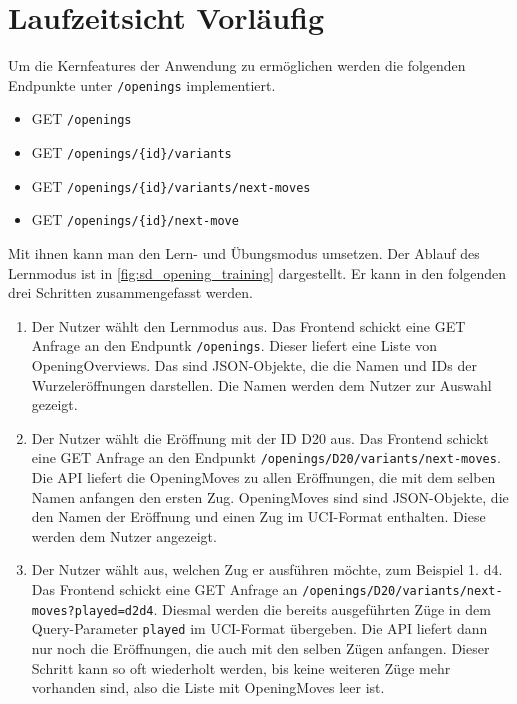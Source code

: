 \section{Laufzeitsicht Vorläufig}
Um die Kernfeatures der Anwendung zu ermöglichen werden die folgenden Endpunkte unter \lstinline{/openings} implementiert.

\begin{itemize}
    \item GET \verb|/openings|
    \item GET \verb|/openings/{id}/variants|
    \item GET \verb|/openings/{id}/variants/next-moves|
    \item GET \verb|/openings/{id}/next-move|
\end{itemize}

Mit ihnen kann man den Lern- und Übungsmodus umsetzen. Der Ablauf des Lernmodus ist in \autoref{fig:sd_opening_training} dargestellt. Er kann in den folgenden drei Schritten zusammengefasst werden.

\begin{enumerate}
     \item Der Nutzer wählt den Lernmodus aus. Das Frontend schickt eine GET Anfrage an den Endpuntk \lstinline{/openings}. Dieser liefert eine Liste von OpeningOverviews. Das sind JSON-Objekte, die die Namen und IDs der Wurzeleröffnungen darstellen. Die Namen werden dem Nutzer zur Auswahl gezeigt.
     \item Der Nutzer wählt die Eröffnung mit der ID D20 aus. Das Frontend schickt eine GET Anfrage an den Endpunkt \lstinline|/openings/D20/variants/next-moves|. Die API liefert die OpeningMoves zu allen Eröffnungen, die mit dem selben Namen anfangen den ersten Zug. OpeningMoves sind sind JSON-Objekte, die den Namen der Eröffnung und einen Zug im UCI-Format enthalten. Diese werden dem Nutzer angezeigt.
     \item Der Nutzer wählt aus, welchen Zug er ausführen möchte, zum Beispiel 1. d4. Das Frontend schickt eine GET Anfrage an \lstinline|/openings/D20/variants/next-moves?played=d2d4|. Diesmal werden die bereits ausgeführten Züge in dem Query-Parameter \lstinline{played} im UCI-Format übergeben. Die API liefert dann nur noch die Eröffnungen, die auch mit den selben Zügen anfangen. Dieser Schritt kann so oft wiederholt werden, bis keine weiteren Züge mehr vorhanden sind, also die Liste mit OpeningMoves leer ist.
\end{enumerate}

